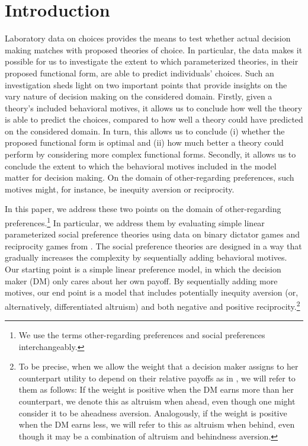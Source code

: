 \documentclass[11pt,a4paper]{article}
\theoremstyle{definition}
\begin{document}
\section{Introduction}
\label{sec:introduction}
Laboratory data on choices provides the means to test whether actual decision making matches with proposed theories of choice. In particular, the data makes it possible for us to investigate the extent to which parameterized theories, in their proposed functional form, are able to predict individuals' choices. Such an investigation sheds light on two important points that provide insights on the vary nature of decision making on the considered domain. Firstly, given a theory's included behavioral motives, it allows us to conclude how well the theory is able to predict the choices, compared to how well a theory could have predicted on the considered domain. In turn, this allows us to conclude (i) whether the proposed functional form is optimal and (ii) how much better a theory could perform by considering more complex functional forms. Secondly, it allows us to conclude the extent to which the behavioral motives included in the model matter for decision making. On the domain of other-regarding preferences, such motives might, for instance, be inequity aversion or reciprocity.

In this paper, we address these two points on the domain of other-regarding preferences.\footnote{We use the terms other-regarding preferences and social preferences interchangeably.}  In particular, we address them by evaluating simple linear parameterized social preference theories using data on binary dictator games and reciprocity games from \cite{Bruhin2019}.  The social preference theories are designed in a way that gradually increases the complexity by sequentially adding behavioral motives. Our starting point is a simple linear preference model, in which the decision maker (DM) only cares about her own payoff. By sequentially adding more motives, our end point is a model that includes potentially inequity aversion (or, alternatively, differentiated altruism) and both negative and positive reciprocity.\footnote{To be precise, when we allow the weight that a decision maker assigns to her counterpart utility to depend on their relative payoffs as in \cite{Fehr1999}, we will refer to them as follows: If the weight is positive when the DM earns more than her counterpart, we denote this as altruism when ahead, even though one might consider it to be aheadness aversion. Analogously, if the weight is positive when the DM earns less, we will refer to this as altruism when behind, even though it may be a combination of altruism and behindness aversion.}
\end{document}
